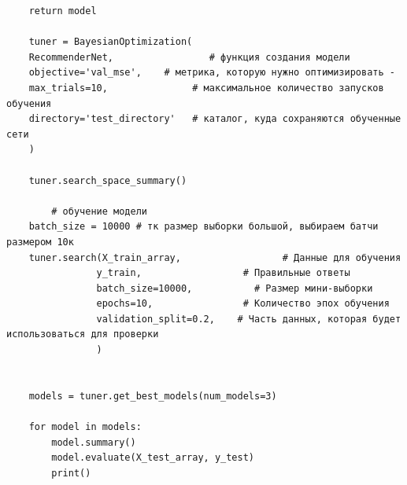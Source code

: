 \documentclass[bachelor, och, diploma]{SCWorks}
\begin{document}
\begin{verbatim}
    return model

	tuner = BayesianOptimization(
    RecommenderNet,                 # функция создания модели
    objective='val_mse',    # метрика, которую нужно оптимизировать -                             
    max_trials=10,               # максимальное количество запусков обучения 
    directory='test_directory'   # каталог, куда сохраняются обученные сети  
    )

	tuner.search_space_summary()

		# обучение модели
	batch_size = 10000 # тк размер выборки большой, выбираем батчи размером 10к
	tuner.search(X_train_array,                  # Данные для обучения
				y_train,                  # Правильные ответы
				batch_size=10000,           # Размер мини-выборки
				epochs=10,                # Количество эпох обучения 
				validation_split=0.2,    # Часть данных, которая будет использоваться для проверки
				)

	
	models = tuner.get_best_models(num_models=3)

	for model in models:
		model.summary()
		model.evaluate(X_test_array, y_test)
		print() 

\end{verbatim}
\end{document}
